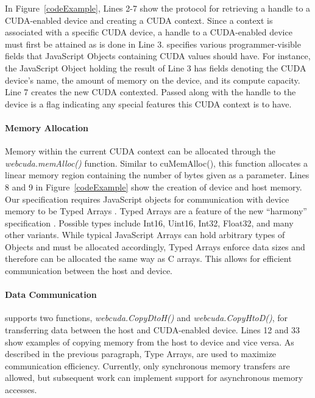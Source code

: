 In Figure~\ref{codeExample}, Lines 2-7 show the protocol for retrieving a handle
to a CUDA-enabled device and creating a CUDA context. Since a context is
associated with a specific CUDA device, a handle to a CUDA-enabled device must
first be attained as is done in Line 3. \name specifies various
programmer-visible fields that JavaScript Objects containing CUDA values should
have. For instance, the JavaScript Object holding the result of Line 3 has
fields denoting the CUDA device's name, the amount of memory on the device, and
its compute capacity. Line 7 creates the new CUDA contexted. Passed along with
the handle to the device is a flag indicating any special features this CUDA
context is to have.

\paragraph{Memory Allocation} Memory within the current CUDA context can be
allocated through the \textit{webcuda.memAlloc()} function. Similar to
cuMemAlloc(), this function allocates a linear memory region containing the
number of bytes given as a parameter. Lines 8 and 9 in Figure~\ref{codeExample}
show the creation of device and host memory.  Our specification requires JavaScript objects
for communication with device memory to be Typed Arrays \cite{typedarray}.
Typed Arrays are a feature of the new ``harmony'' specification \cite{harmony}.
Possible types include Int16, Uint16, Int32, Float32, and many other variants.
While typical JavaScript Arrays can hold arbitrary types of Objects and must be
allocated accordingly, Typed Arrays enforce data sizes and therefore can be
allocated the same way as C arrays. This allows for efficient communication
between the host and device.


\paragraph{Data Communication} \name supports two functions,
\textit{webcuda.CopyDtoH()} and \textit{webcuda.CopyHtoD()}, for transferring
data between the host and CUDA-enabled device. Lines 12 and 33 show examples of
copying memory from the host to device and vice versa. As described in the
previous paragraph, Type Arrays, are used to maximize
communication efficiency. Currently, only synchronous memory transfers are
allowed, but subsequent work can implement support for asynchronous memory
accesses.

